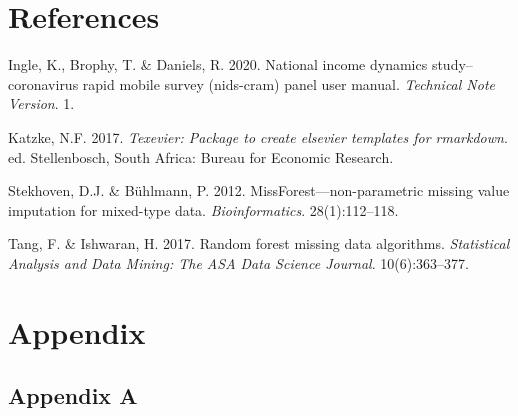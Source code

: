 \documentclass[11pt,preprint, authoryear]{elsarticle}
\numberwithin{equation}{section}
\numberwithin{figure}{section}
\numberwithin{table}{section}
\begin{document}
\newpage

\hypertarget{references}{%
\section*{References}\label{references}}

\hypertarget{refs}{}
\leavevmode\hypertarget{ref-nids2020}{}%
Ingle, K., Brophy, T. \& Daniels, R. 2020. National income dynamics
study--coronavirus rapid mobile survey (nids-cram) panel user manual.
\emph{Technical Note Version}. 1.

\leavevmode\hypertarget{ref-Texevier}{}%
Katzke, N.F. 2017. \emph{Texevier: Package to create elsevier templates
for rmarkdown}. ed. Stellenbosch, South Africa: Bureau for Economic
Research.

\leavevmode\hypertarget{ref-stekhoven2012missforest}{}%
Stekhoven, D.J. \& Bühlmann, P. 2012. MissForest---non-parametric
missing value imputation for mixed-type data. \emph{Bioinformatics}.
28(1):112--118.

\leavevmode\hypertarget{ref-tang2017random}{}%
Tang, F. \& Ishwaran, H. 2017. Random forest missing data algorithms.
\emph{Statistical Analysis and Data Mining: The ASA Data Science
Journal}. 10(6):363--377.

\hypertarget{appendix}{%
\section*{Appendix}\label{appendix}}

\hypertarget{appendix-a}{%
\subsection*{Appendix A}\label{appendix-a}}


\end{document}
